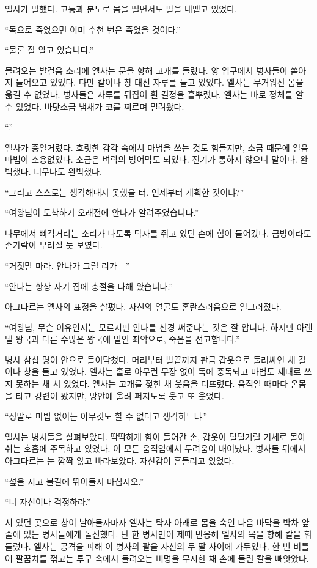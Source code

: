엘사가 말했다. 고통과 분노로 몸을 떨면서도 말을 내뱉고 있었다.

``독으로 죽었으면 이미 수천 번은 죽었을 것이다.''

``물론 잘 알고 있습니다.''

몰려오는 발걸음 소리에 엘사는 문을 향해 고개를 돌렸다. 양 입구에서 병사들이 쏟아져 들어오고 있었다. 다만 칼이나 창 대신 자루를 들고 있었다. 엘사는 무거워진 몸을 옮길 수 없었다. 병사들은 자루를 뒤집어 흰 결정을 흩뿌렸다. 엘사는 바로 정체를 알 수 있었다. 바닷소금 냄새가 코를 찌르며 밀려왔다.

``.''

엘사가 중얼거렸다. 흐릿한 감각 속에서 마법을 쓰는 것도 힘들지만, 소금 때문에 얼음 마법이 소용없었다. 소금은 벼락의 방어막도 되었다. 전기가 통하지 않으니 말이다. 완벽했다. 너무나도 완벽했다.

``그리고 스스로는 생각해내지 못했을 터. 언제부터 계획한 것이냐?''

``여왕님이 도착하기 오래전에 안나가 알려주었습니다.''

나무에서 삐걱거리는 소리가 나도록 탁자를 쥐고 있던 손에 힘이 들어갔다. 금방이라도 손가락이 부러질 듯 보였다.

``거짓말 마라. 안나가 그럴 리가—''

``안나는 항상 자기 집에 충절을 다해 왔습니다.''

아그다르는 엘사의 표정을 살폈다. 자신의 얼굴도 혼란스러움으로 일그러졌다.

``여왕님, 무슨 이유인지는 모르지만 안나를 신경 써준다는 것은 잘 압니다. 하지만 아렌델 왕국과 다른 수많은 왕국에 벌인 죄악으로, 죽음을 선고합니다.''

병사 삼십 명이 안으로 들이닥쳤다. 머리부터 발끝까지 판금 갑옷으로 둘러싸인 채 칼이나 창을 들고 있었다. 엘사는 홀로 아무런 무장 없이 독에 중독되고 마법도 제대로 쓰지 못하는 채 서 있었다. 엘사는 고개를 젖힌 채 웃음을 터뜨렸다. 움직일 때마다 온몸을 타고 경련이 왔지만, 방안에 울려 퍼지도록 웃고 또 웃었다.

``정말로 마법 없이는 아무것도 할 수 없다고 생각하느냐.''

엘사는 병사들을 살펴보았다. 딱딱하게 힘이 들어간 손, 갑옷이 덜덜거릴 기세로 몰아쉬는 호흡에 주목하고 있었다. 이 모든 움직임에서 두려움이 배어났다. 병사들 뒤에서 아그다르는 눈 깜짝 않고 바라보았다. 자신감이 흔들리고 있었다.

``섶을 지고 불길에 뛰어들지 마십시오.''

``너 자신이나 걱정하라.''

서 있던 곳으로 창이 날아들자마자 엘사는 탁자 아래로 몸을 숙인 다음 바닥을 박차 앞줄에 있는 병사들에게 돌진했다. 단 한 병사만이 제때 반응해 엘사의 목을 향해 칼을 휘둘렀다. 엘사는 공격을 피해 이 병사의 팔을 자신의 두 팔 사이에 가두었다. 한 번 비틀어 팔꿈치를 꺾고는 투구 속에서 들려오는 비명을 무시한 채 손에 들린 칼을 빼앗았다.

